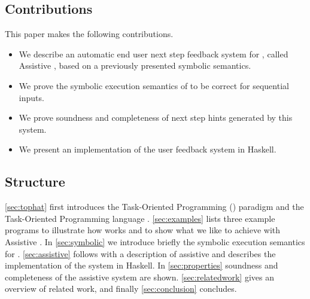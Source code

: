 \subsection{Contributions}

This paper makes the following contributions.

\begin{itemize}
  \item We describe an automatic end user next step feedback system for \TOPHAT, called Assistive \TOPHAT, based on a previously presented symbolic semantics.
  \item We prove the symbolic execution semantics of \TOPHAT to be correct for sequential inputs.
  \item We prove soundness and completeness of next step hints generated by this system.
  \item We present an implementation of the user feedback system in Haskell.
\end{itemize}


\subsection{Structure}

\cref{sec:tophat} first introduces the Task-Oriented Programming (\TOP) paradigm and the Task-Oriented Programming language \TOPHAT.
\cref{sec:examples} lists three example programs to illustrate how \TOPHAT works and to show what we like to achieve with Assistive \TOPHAT.
In \cref{sec:symbolic} we introduce briefly the symbolic execution semantics for \TOPHAT.
\cref{sec:assistive} follows with a description of assistive \TOPHAT
and describes the implementation of the system in Haskell.
In \cref{sec:properties} soundness and completeness of the assistive system are shown.
\cref{sec:relatedwork} gives an overview of related work, and finally \cref{sec:conclusion} concludes.
